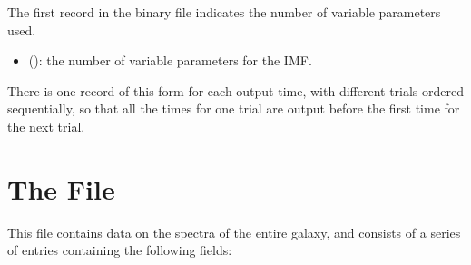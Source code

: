 \documentclass[letterpaper,10pt,english]{sphinxmanual}
\begin{document}
The first record in the binary file indicates the number of variable parameters used.
\begin{itemize}
\item {} 
 (): the number of variable parameters for the IMF.

\end{itemize}

There is one record of this form for each output time, with different trials ordered sequentially, so that all the times for one trial are output before the first time for the next trial.


\section{The  File}
\label{\detokenize{output:ssec-int-spec-file}}\label{\detokenize{output:the-integrated-spec-file}}
This file contains data on the spectra of the entire galaxy, and consists of a series of entries containing the following fields:
\end{document}
